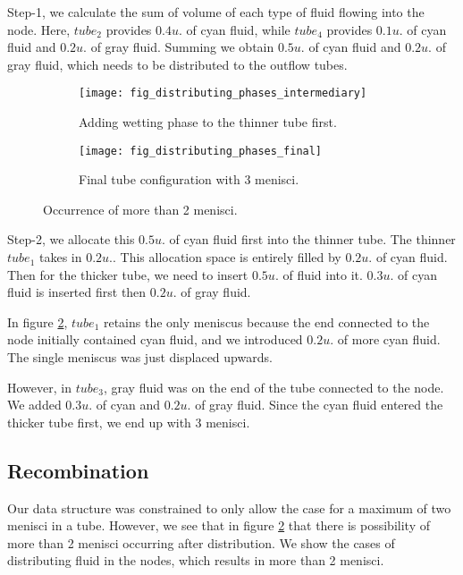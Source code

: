	Step-1, we calculate the sum of volume of each type of fluid flowing into the node. Here, ${tube}_2$ provides $0.4 u.$ of cyan fluid, while ${tube}_4$ provides $0.1 u.$ of cyan fluid and $0.2 u.$ of gray fluid. Summing we obtain $0.5 u.$ of cyan fluid and $0.2 u.$ of gray fluid, which needs to be distributed to the outflow tubes.
	
	\begin{figure}[H]
		\centering
		\begin{subfigure}{0.48\textwidth}
			\centering
			\texttt{[image: fig\_distributing\_phases\_intermediary]}
			\caption{Adding wetting phase to the thinner tube first.}
		\end{subfigure}
		\begin{subfigure}{0.42\textwidth}
			\centering
			\texttt{[image: fig\_distributing\_phases\_final]}
			\caption{Final tube configuration with 3 menisci.}
			\label{fig:distributing_phases_final}
		\end{subfigure}
		\caption{Occurrence of more than 2 menisci.}
	\end{figure}
	
	Step-2, we allocate this $0.5 u.$ of cyan fluid first into the thinner tube. The thinner ${tube}_1$ takes in $0.2 u.$. This allocation space is entirely filled by $0.2 u.$ of cyan fluid. Then for the thicker tube, we need to insert $0.5 u.$ of fluid into it. $0.3 u.$ of cyan fluid is inserted first then $0.2 u.$ of gray fluid.
	
	In figure \ref{fig:distributing_phases_final}, ${tube}_1$ retains the only meniscus because the end connected to the node initially contained cyan fluid, and we introduced $0.2 u.$ of more cyan fluid. The single meniscus was just displaced upwards.
	
	However, in ${tube}_3$, gray fluid was on the end of the tube connected to the node. We added $0.3 u.$ of cyan and $0.2 u.$ of gray fluid. Since the cyan fluid entered the thicker tube first, we end up with 3 menisci.	

\subsection{Recombination} \label{sec:recombination-details}
	Our data structure was constrained to only allow the case for a maximum of two menisci in a tube. However, we see that in figure \ref{fig:distributing_phases_final} that there is possibility of more than 2 menisci occurring after distribution. We show the cases of distributing fluid in the nodes, which results in more than 2 menisci.
	
